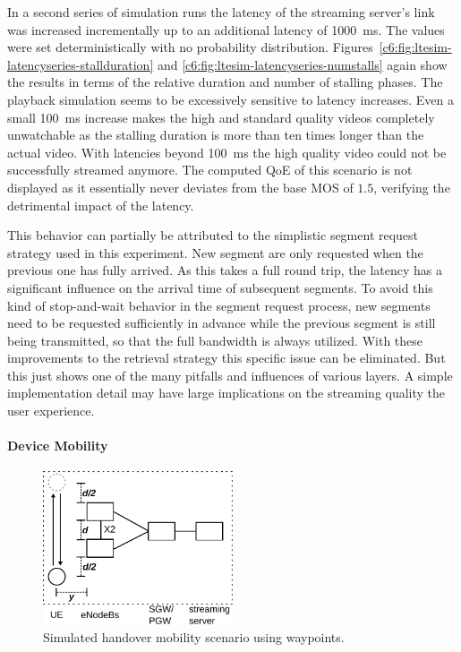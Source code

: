 {In a second series of simulation runs the latency of the streaming server's link was increased incrementally up to an additional latency of \SI{1000}{\milli\second}. The values were set deterministically with no probability distribution. Figures~\ref{c6:fig:ltesim-latencyseries-stallduration} and \ref{c6:fig:ltesim-latencyseries-numstalls} again show the results in terms of the relative duration and number of stalling phases. The playback simulation seems to be excessively sensitive to latency increases. Even a small \SI{100}{\milli\second} increase makes the high and standard quality videos completely unwatchable as the stalling duration is more than ten times longer than the actual video. With latencies beyond \SI{100}{\milli\second} the high quality video could not be successfully streamed anymore. The computed \gls{QoE} of this scenario is not displayed as it essentially never deviates from the base \gls{MOS} of $1.5$, verifying the detrimental impact of the latency.

This behavior can partially be attributed to the simplistic segment request strategy used in this experiment. New segment are only requested when the previous one has fully arrived. As this takes a full round trip, the latency has a significant influence on the arrival time of subsequent segments. To avoid this kind of stop-and-wait behavior in the segment request process, new segments need to be requested sufficiently in advance while the previous segment is still being transmitted, so that the full bandwidth is always utilized. With these improvements to the retrieval strategy this specific issue can be eliminated. But this just shows one of the many pitfalls and influences of various layers. A simple implementation detail may have large implications on the streaming quality the user experience.


\paragraph{Device Mobility}
\label{c6:sec:mobilitystreamingsim}

\begin{figure}[htb]
	\centering
	\includegraphics[width=0.5\textwidth]{images/streaming-simulation-mobility.pdf}
	\caption{Simulated handover mobility scenario using waypoints.}
\label{c6:fig:streaming-simulation-mobility}
\end{figure}

}
